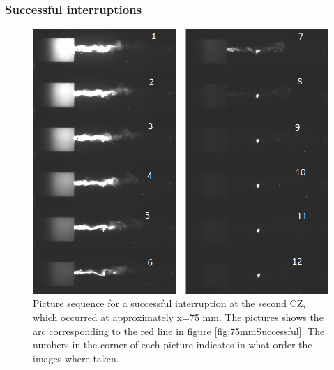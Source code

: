 \documentclass[10pt,b5paper,twoside]{article}
\begin{document}
\subsubsection{Successful interruptions}
\begin{figure}[H]
\centering
\includegraphics[scale=0.7, angle =0 ]{Bilder/Results/124_75_TR_OK.png}
\caption{Picture sequence for a successful interruption at the second CZ, which occurred at approximately x=75 mm. The pictures shows the arc corresponding to the red line in figure \ref{fig:75mmSuccessful}. The numbers in the corner of each picture indicates in what order the images where taken.} \label{fig:arcingVoltage_test_124_red_OK}
\end{figure}
\end{document}

